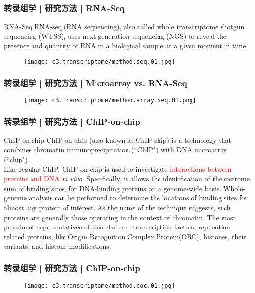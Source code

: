 \begin{frame}
  \frametitle{转录组学 | 研究方法 | RNA-Seq}
  {\footnotesize
  \begin{block}{RNA-Seq}
    RNA-seq (RNA sequencing), also called whole transcriptome shotgun sequencing (WTSS), uses next-generation sequencing (NGS) to reveal the presence and quantity of RNA in a biological sample at a given moment in time.
  \end{block}
  }
  \begin{figure}
    \centering
    \texttt{[image: c3.transcriptome/method.seq.01.jpg]}
  \end{figure}
\end{frame}

\begin{frame}
  \frametitle{转录组学 | 研究方法 | Microarray vs. RNA-Seq}
  \begin{figure}
    \centering
    \texttt{[image: c3.transcriptome/method.array.seq.01.png]}
  \end{figure}
\end{frame}

\begin{frame}
  \frametitle{转录组学 | 研究方法 | ChIP-on-chip}
  \begin{block}{ChIP-on-chip}
    ChIP-on-chip (also known as ChIP-chip) is a technology that combines chromatin immunoprecipitation (``ChIP") with DNA microarray (``chip").\\
    \vspace{1em}
    Like regular ChIP, ChIP-on-chip is used to investigate \textcolor{red}{interactions between proteins and DNA} \textit{in vivo}. Specifically, it allows the identification of the cistrome, sum of binding sites, for DNA-binding proteins on a genome-wide basis. Whole-genome analysis can be performed to determine the locations of binding sites for almost any protein of interest. As the name of the technique suggests, such proteins are generally those operating in the context of chromatin. The most prominent representatives of this class are transcription factors, replication-related proteins, like Origin Recognition Complex Protein(ORC), histones, their variants, and histone modifications.
  \end{block}
\end{frame}

\begin{frame}
  \frametitle{转录组学 | 研究方法 | ChIP-on-chip}
  \begin{figure}
    \centering
    \texttt{[image: c3.transcriptome/method.coc.01.jpg]}
  \end{figure}
\end{frame}

